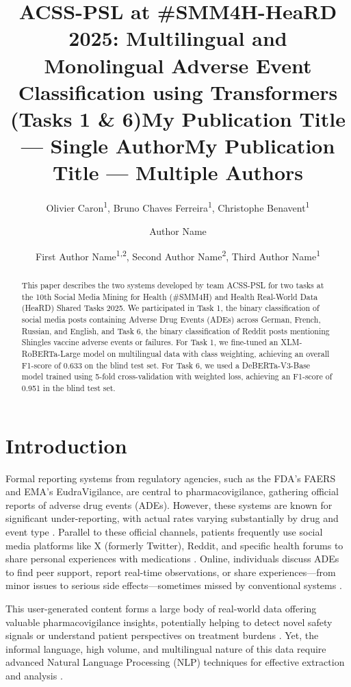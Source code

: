 \documentclass[letterpaper]{article} %
\title{ACSS-PSL at \#SMM4H-HeaRD 2025: Multilingual and Monolingual Adverse Event Classification using Transformers (Tasks 1 \& 6)}
\author {
    Olivier Caron\textsuperscript{\rm 1},
    Bruno Chaves Ferreira\textsuperscript{\rm 1},
    Christophe Benavent\textsuperscript{\rm 1}
}
\title{My Publication Title --- Single Author}
\author {
    Author Name
}
\title{My Publication Title --- Multiple Authors}
\author {
    First Author Name\textsuperscript{\rm 1,\rm 2},
    Second Author Name\textsuperscript{\rm 2},
    Third Author Name\textsuperscript{\rm 1}
}
\begin{document}
\maketitle

\begin{abstract}
This paper describes the two systems developed by team ACSS-PSL for two tasks at the 10th Social Media Mining for Health (\#SMM4H) and Health Real-World Data (HeaRD) Shared Tasks 2025.
We participated in Task 1, the binary classification of social media posts containing Adverse Drug Events (ADEs) across German, French, Russian, and English, and Task 6, the binary classification of Reddit posts mentioning Shingles vaccine adverse events or failures.
For Task 1, we fine-tuned an XLM-RoBERTa-Large model on multilingual data with class weighting, achieving an overall F1-score of 0.633 on the blind test set.
For Task 6, we used a DeBERTa-V3-Base model trained using 5-fold cross-validation with weighted loss, achieving an F1-score of 0.951 in the blind test set.
\end{abstract}

%
\begin{links}
\end{links}

\section{Introduction}

Formal reporting systems from regulatory agencies, such as the FDA's FAERS and EMA's EudraVigilance, are central to pharmacovigilance, gathering official reports of adverse drug events (ADEs).
However, these systems are known for significant under-reporting, with actual rates varying substantially by drug and event type \cite{alatawi2017empirical}.
Parallel to these official channels, patients frequently use social media platforms like X (formerly Twitter), Reddit, and specific health forums to share personal experiences with medications \cite{golder2021comparative}.
Online, individuals discuss ADEs to find peer support, report real-time observations, or share experiences—from minor issues to serious side effects—sometimes missed by conventional systems \cite{golder2021comparative, zhou2020complementing, yu2022assessment}.

This user-generated content forms a large body of real-world data offering valuable pharmacovigilance insights, potentially helping to detect novel safety signals or understand patient perspectives on treatment burdens \cite{yang2014postmarketing, liu2014identifying}.
Yet, the informal language, high volume, and multilingual nature of this data require advanced Natural Language Processing (NLP) techniques for effective extraction and analysis \cite{liu2015identifying, yang2012detecting}.
\end{document}
